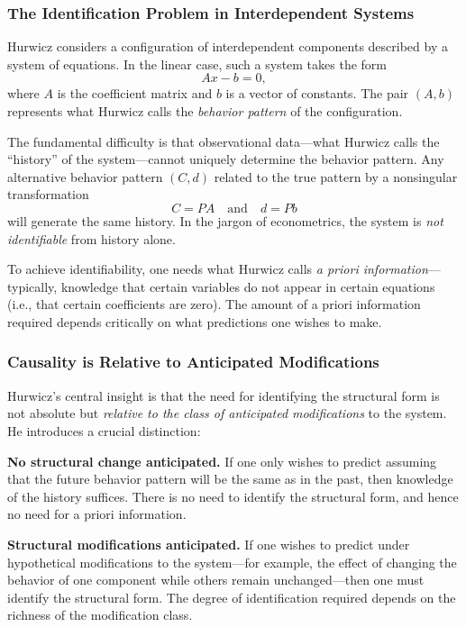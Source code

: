 \documentclass[12pt]{article}
\begin{document}
\subsubsection{The Identification Problem in Interdependent Systems}

Hurwicz considers a configuration of interdependent components described by a system of equations. In the linear case, such a system takes the form
\[
Ax - b = 0,
\]
where $A$ is the coefficient matrix and $b$ is a vector of constants. The pair $(A, b)$ represents what Hurwicz calls the \emph{behavior pattern} of the configuration.

The fundamental difficulty is that observational data---what Hurwicz calls the ``history'' of the system---cannot uniquely determine the behavior pattern. Any alternative behavior pattern $(C, d)$ related to the true pattern by a nonsingular transformation
\[
C = PA \quad \text{and} \quad d = Pb
\]
will generate the same history. In the jargon of econometrics, the system is \emph{not identifiable} from history alone.

To achieve identifiability, one needs what Hurwicz calls \emph{a priori information}---typically, knowledge that certain variables do not appear in certain equations (i.e., that certain coefficients are zero). The amount of a priori information required depends critically on what predictions one wishes to make.

\subsubsection{Causality is Relative to Anticipated Modifications}

Hurwicz's central insight is that the need for identifying the structural form is not absolute but \emph{relative to the class of anticipated modifications} to the system. He introduces a crucial distinction:

\textbf{No structural change anticipated.} If one only wishes to predict assuming that the future behavior pattern will be the same as in the past, then knowledge of the history suffices. There is no need to identify the structural form, and hence no need for a priori information.

\textbf{Structural modifications anticipated.} If one wishes to predict under hypothetical modifications to the system---for example, the effect of changing the behavior of one component while others remain unchanged---then one must identify the structural form. The degree of identification required depends on the richness of the modification class.
\end{document}
